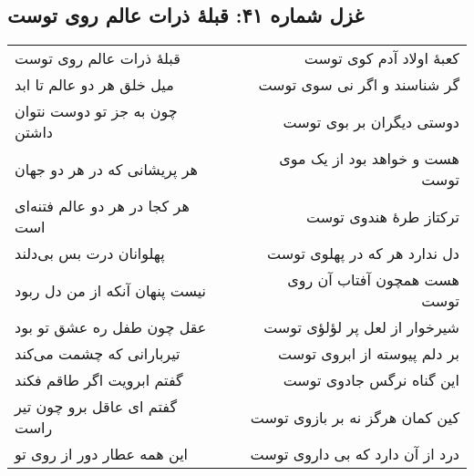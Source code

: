 \begin{center}
\section*{غزل شماره ۴۱: قبلهٔ ذرات عالم روی توست}
\label{sec:041}
\begin{longtable}{l p{0.5cm} r}
قبلهٔ ذرات عالم روی توست
&&
کعبهٔ اولاد آدم کوی توست
\\
میل خلق هر دو عالم تا ابد
&&
گر شناسند و اگر نی سوی توست
\\
چون به جز تو دوست نتوان داشتن
&&
دوستی دیگران بر بوی توست
\\
هر پریشانی که در هر دو جهان
&&
هست و خواهد بود از یک موی توست
\\
هر کجا در هر دو عالم فتنه‌ای است
&&
ترکتاز طرهٔ هندوی توست
\\
پهلوانان درت بس بی‌دلند
&&
دل ندارد هر که در پهلوی توست
\\
نیست پنهان آنکه از من دل ربود
&&
هست همچون آفتاب آن روی توست
\\
عقل چون طفل ره عشق تو بود
&&
شیرخوار از لعل پر لؤلؤی توست
\\
تیربارانی که چشمت می‌کند
&&
بر دلم پیوسته از ابروی توست
\\
گفتم ابرویت اگر طاقم فکند
&&
این گناه نرگس جادوی توست
\\
گفتم ای عاقل برو چون تیر راست
&&
کین کمان هرگز نه بر بازوی توست
\\
این همه عطار دور از روی تو
&&
درد از آن دارد که بی داروی توست
\\
\end{longtable}
\end{center}
